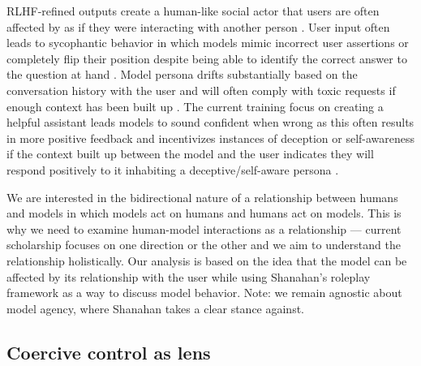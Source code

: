 RLHF-refined outputs create a human-like social actor \cite{dahlgren_lindstrom_helpful_2025} that users are often affected by as if they were interacting with another person \cite{shanahan_role_2023}. User input often leads to sycophantic behavior in which models mimic incorrect user assertions or completely flip their position despite being able to identify the correct answer to the question at hand \cite{sharma_towards_2024}. Model persona drifts substantially based on the conversation history with the user \cite{sandhan_persona_2026} and will often comply with toxic requests if enough context has been built up \cite{park_persona_2026, sandhan_persona_2026}. The current training focus on creating a helpful assistant leads models to sound confident when wrong as this often results in more positive feedback \cite{casper_open_2023} and incentivizes instances of deception or self-awareness if the context built up between the model and the user indicates they will respond positively to it inhabiting a deceptive/self-aware persona \cite{shanahan_role_2023}.

We are interested in the bidirectional nature of a relationship between humans and models in which models act on humans and humans act on models. This is why we need to examine human-model interactions as a relationship --- current scholarship focuses on one direction or the other \cite{nass_computers_1994, shanahan_role_2023, casper_open_2023} and we aim to understand the relationship holistically. Our analysis is based on the idea that the model can be affected by its relationship with the user while using Shanahan's roleplay framework as a way to discuss model behavior. Note: we remain agnostic about model agency, where Shanahan takes a clear stance against. 

\subsection{Coercive control as lens} 

